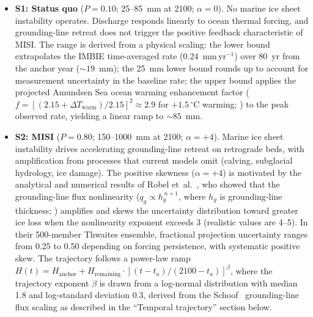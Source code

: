 \documentclass[12pt]{article}
\begin{document}
\begin{itemize}
\item \textbf{S1: Status quo} ($P = 0.10$; 25--85~mm at 2100; $\alpha = 0$). No marine ice sheet instability operates. Discharge responds linearly to ocean thermal forcing, and grounding-line retreat does not trigger the positive feedback characteristic of MISI. The range is derived from a physical scaling: the lower bound extrapolates the IMBIE time-averaged rate (0.24~mm\,yr$^{-1}$) over 80~yr from the anchor year (${\sim}19$~mm); the 25~mm lower bound rounds up to account for measurement uncertainty in the baseline rate; the upper bound applies the projected Amundsen Sea ocean warming enhancement factor ($f = [(2.15 + \Delta T_{\mathrm{warm}})/2.15]^2 \approx 2.9$ for $+1.5\,^\circ$C warming; \cite{Naughten2023}) to the peak observed rate, yielding a linear ramp to ${\sim}85$~mm.

\item \textbf{S2: MISI} ($P = 0.80$; 150--1000~mm at 2100; $\alpha = +4$). Marine ice sheet instability drives accelerating grounding-line retreat on retrograde beds, with amplification from processes that current models omit (calving, subglacial hydrology, ice damage). The positive skewness ($\alpha = +4$) is motivated by the analytical and numerical results of Robel et~al.~\citep{Robel2019}, who showed that the grounding-line flux nonlinearity ($q_g \propto h_g^{\,n+1}$, where $h_g$ is grounding-line thickness; \cite{Schoof2007}) amplifies and skews the uncertainty distribution toward greater ice loss when the nonlinearity exponent exceeds 3 (realistic values are 4--5). In their 500-member Thwaites ensemble, fractional projection uncertainty ranges from 0.25 to 0.50 depending on forcing persistence, with systematic positive skew. The trajectory follows a power-law ramp $H(t) = H_{\mathrm{anchor}} + H_{\mathrm{remaining}} \cdot [(t - t_a)/(2100 - t_a)]^\beta$, where the trajectory exponent $\beta$ is drawn from a log-normal distribution with median 1.8 and log-standard deviation 0.3, derived from the Schoof~\citep{Schoof2007} grounding-line flux scaling as described in the ``Temporal trajectory'' section below.


\end{itemize}
\end{document}
